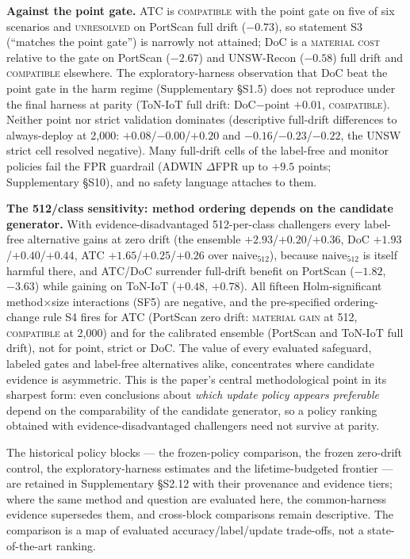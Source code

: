 \documentclass[journal]{IEEEtran}
\begin{document}
\textbf{Against the point gate.} ATC is \textsc{compatible} with the point gate on five of six scenarios and \textsc{unresolved} on PortScan full drift ($-0.73$), so statement S3 (``matches the point gate'') is narrowly not attained; DoC is a \textsc{material cost} relative to the gate on PortScan ($-2.67$) and UNSW-Recon ($-0.58$) full drift and \textsc{compatible} elsewhere. The exploratory-harness observation that DoC beat the point gate in the harm regime (Supplementary \S S1.5) does not reproduce under the final harness at parity (ToN-IoT full drift: DoC$-$point $+0.01$, \textsc{compatible}). Neither point nor strict validation dominates (descriptive full-drift differences to always-deploy at 2{,}000: $+0.08$/$-0.00$/$+0.20$ and $-0.16$/$-0.23$/$-0.22$, the UNSW strict cell resolved negative). Many full-drift cells of the label-free and monitor policies fail the FPR guardrail (ADWIN $\Delta$FPR up to $+9.5$ points; Supplementary \S S10), and no safety language attaches to them.

\textbf{The 512/class sensitivity: method ordering depends on the candidate generator.} With evidence-disadvantaged 512-per-class challengers every label-free alternative gains at zero drift (the ensemble $+2.93$/$+0.20$/$+0.36$, DoC $+1.93$/$+0.40$/$+0.44$, ATC $+1.65$/$+0.25$/$+0.26$ over naive$_{512}$), because naive$_{512}$ is itself harmful there, and ATC/DoC surrender full-drift benefit on PortScan ($-1.82$, $-3.63$) while gaining on ToN-IoT ($+0.48$, $+0.78$). All fifteen Holm-significant method$\times$size interactions (SF5) are negative, and the pre-specified ordering-change rule S4 fires for ATC (PortScan zero drift: \textsc{material gain} at 512, \textsc{compatible} at 2{,}000) and for the calibrated ensemble (PortScan and ToN-IoT full drift), not for point, strict or DoC. The value of every evaluated safeguard, labeled gates and label-free alternatives alike, concentrates where candidate evidence is asymmetric. This is the paper's central methodological point in its sharpest form: even conclusions about \emph{which update policy appears preferable} depend on the comparability of the candidate generator, so a policy ranking obtained with evidence-disadvantaged challengers need not survive at parity.

The historical policy blocks --- the frozen-policy comparison, the frozen zero-drift control, the exploratory-harness estimates and the lifetime-budgeted frontier --- are retained in Supplementary \S S2.12 with their provenance and evidence tiers; where the same method and question are evaluated here, the common-harness evidence supersedes them, and cross-block comparisons remain descriptive. The comparison is a map of evaluated accuracy/label/update trade-offs, not a state-of-the-art ranking.
\end{document}
